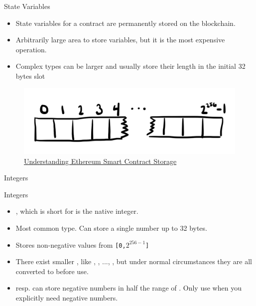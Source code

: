 \documentclass[handout]{beamer}
\begin{document}
\begin{frame}{State Variables}

	\begin{itemize}
		\item State variables for a contract are permanently stored on the blockchain.
		\item Arbitrarily large area to store variables, but it is the most expensive operation.
		\item Complex types can be larger and usually store their length in the initial 32 bytes slot
	\end{itemize}
	
	\begin{figure}
		\includegraphics[scale=0.2]{../assets/images/sc_storage}
\caption{\link \href{https://programtheblockchain.com/posts/2018/03/09/understanding-ethereum-smart-contract-storage/}{Understanding Ethereum Smart Contract Storage}}
		\label{fig:sc_storage}
	\end{figure}

\end{frame}

\begin{frame}{Integers}

	\begin{samplecode}{Integers}
		
	\end{samplecode}
	\begin{itemize}
		\item<2->{, which is short for  is the native integer.}
		\item<3->{Most common type. Can store a single number up to 32 bytes.}
		\item<4->{Stores non-negative values from \texttt{[0,$2^{256-1}$]}}
		\item<5->{There exist smaller , like , , ..., , but under normal circumstances they are all converted to  before use.}
		\item<6->{ resp.  can store negative numbers in half the range of . Only use  when you explicitly need negative numbers. }
	\end{itemize}

\end{frame}
\end{document}
